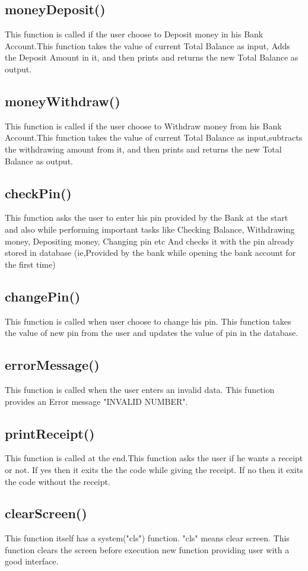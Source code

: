 \documentclass{article}
\begin{document}
\subsection{moneyDeposit()}
This function is called if the user choose to Deposit money in his Bank Account.This function takes the value of current Total Balance as input, Adds the Deposit Amount in it, and then prints and  returns the new Total Balance as output.
\subsection{moneyWithdraw()}
This function is called if the user choose to Withdraw money from his Bank Account.This function takes the value of current Total Balance as input,subtracts the withdrawing amount from it, and then prints and  returns the new Total Balance as output.
\subsection{checkPin()}
This function asks the user to enter his pin provided by the Bank at the start and also while performing important tasks like Checking Balance, Withdrawing money, Depositing money, Changing pin etc And checks it with the pin already stored in database (ie,Provided by the bank while opening the bank account for the first time)
\subsection{changePin()}
This function is called when user choose to change his pin. This function takes the value of new pin from the user and updates the value of pin in the database.
\subsection{errorMessage()}
This function is called when the user enters an invalid data. This function provides an Error message "INVALID NUMBER".
\subsection{printReceipt()}
This function is called at the end.This function asks the user if he wants a receipt or not. If yes then it exits the the code while giving the receipt. If no then it exits the code without the receipt.
\subsection{clearScreen()}
 This function itself has a system("cls") function. "cls" means clear screen. This function clears the screen before execution new function providing user with a good interface. 
\end{document}

